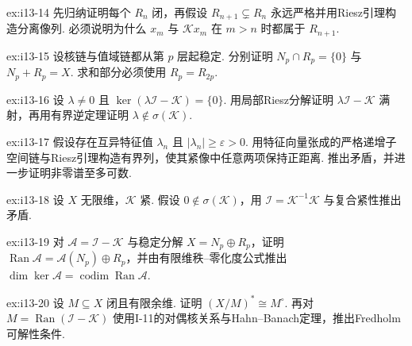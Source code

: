 \begin{FAExercise}[值域链闭性与稳定化]{ex:i13-14}
先归纳证明每个 \(\displaystyle R_n\) 闭，再假设 \(\displaystyle R_{n+1}\subsetneq R_n\) 永远严格并用Riesz引理构造分离像列. 必须说明为什么 \(\displaystyle x_m\) 与 \(\displaystyle \mathcal Kx_m\) 在 \(\displaystyle m>n\) 时都属于 \(\displaystyle R_{n+1}\).
\end{FAExercise}

\begin{FAExercise}[局部Riesz分解]{ex:i13-15}
设核链与值域链都从第 \(\displaystyle p\) 层起稳定. 分别证明 \(\displaystyle N_p\cap R_p=\{0\}\) 与 \(\displaystyle N_p+R_p=X\). 求和部分必须使用 \(\displaystyle R_p=R_{2p}\).
\end{FAExercise}

\begin{FAExercise}[非零谱等于点谱]{ex:i13-16}
设 \(\displaystyle \lambda\neq0\) 且 \(\displaystyle \ker(\lambda\mathcal I-\mathcal K)=\{0\}\). 用局部Riesz分解证明 \(\displaystyle \lambda\mathcal I-\mathcal K\) 满射，再用有界逆定理证明 \(\displaystyle \lambda\notin\sigma(\mathcal K)\).
\end{FAExercise}

\begin{FAExercise}[非零谱离散性]{ex:i13-17}
假设存在互异特征值 \(\displaystyle \lambda_n\) 且 \(\displaystyle |\lambda_n|\geqslant\varepsilon>0\). 用特征向量张成的严格递增子空间链与Riesz引理构造有界列，使其紧像中任意两项保持正距离. 推出矛盾，并进一步证明非零谱至多可数.
\end{FAExercise}

\begin{FAExercise}[零必在无限维紧算子谱中]{ex:i13-18}
设 \(\displaystyle X\) 无限维，\(\displaystyle \mathcal K\) 紧. 假设 \(\displaystyle0\notin\sigma(\mathcal K)\)，用 \(\displaystyle \mathcal I=\mathcal K^{-1}\mathcal K\) 与复合紧性推出矛盾.
\end{FAExercise}

\begin{FAExercise}[零化度与亏维]{ex:i13-19}
对 \(\displaystyle \mathcal A=\mathcal I-\mathcal K\) 与稳定分解 \(\displaystyle X=N_p\oplus R_p\)，证明 \(\displaystyle \operatorname{Ran}\mathcal A=\mathcal A(N_p)\oplus R_p\)，并由有限维秩--零化度公式推出 \(\displaystyle \dim\ker\mathcal A=\operatorname{codim}\operatorname{Ran}\mathcal A\).
\end{FAExercise}

\begin{FAExercise}[湮灭子与可解性]{ex:i13-20}
设 \(\displaystyle M\subseteq X\) 闭且有限余维. 证明 \(\displaystyle (X/M)^*\cong M^\circ\). 再对 \(\displaystyle M=\operatorname{Ran}(\mathcal I-\mathcal K)\) 使用I-11的对偶核关系与Hahn--Banach定理，推出Fredholm可解性条件.
\end{FAExercise}

